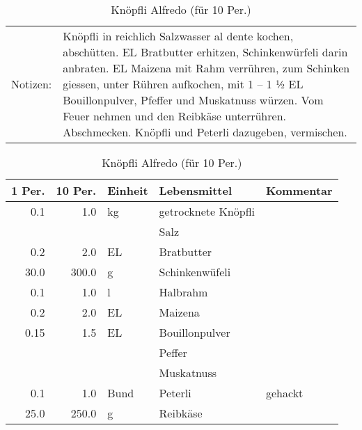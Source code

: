 \documentclass[11pt,a4paper]{article}%
\begin{document}
%
%
\vspace{0.75cm}%
\renewcommand{\arraystretch}{1.25}%


\begin{table}[h]%
\caption{Knöpfli Alfredo (für 10 Per.)}%
\begin{tabularx}{\textwidth}{l X}%
Notizen:&Knöpfli in reichlich Salzwasser al dente kochen, abschütten.\newline%
2 EL Bratbutter erhitzen, Schinkenwürfeli darin anbraten. \newline%
2 EL Maizena mit Rahm verrühren, zum Schinken giessen, unter Rühren aufkochen, mit 1 – 1 ½ EL Bouillonpulver, Pfeffer und Muskatnuss würzen. Vom Feuer nehmen und den Reibkäse unterrühren. Abschmecken. Knöpfli und Peterli dazugeben, vermischen.\\%
\end{tabularx}%
\par%
\begin{tabularx}{\textwidth}{| r | r | l | l | X |}%
\hline%
\tiny{1 Per.}&\tiny{10 Per.}&\tiny{Einheit}&\tiny{Lebensmittel}&\tiny{Kommentar}\\%
\hline%
0.1&1.0&kg&getrocknete Knöpfli&\\%
\hline%
&&&Salz&\\%
\hline%
0.2&2.0&EL&Bratbutter&\\%
\hline%
30.0&300.0&g&Schinkenwüfeli&\\%
\hline%
0.1&1.0&l&Halbrahm&\\%
\hline%
0.2&2.0&EL&Maizena&\\%
\hline%
0.15&1.5&EL&Bouillonpulver&\\%
\hline%
&&&Peffer&\\%
\hline%
&&&Muskatnuss &\\%
\hline%
0.1&1.0&Bund&Peterli&gehackt\\%
\hline%
25.0&250.0&g&Reibkäse&\\%
\hline%
\end{tabularx}%
\end{table}

%
\vspace{0.75cm}%
\renewcommand{\arraystretch}{1.25}%
\end{document}
